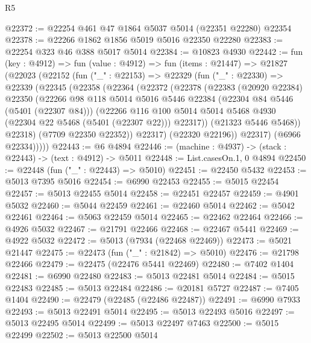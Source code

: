 \begin{lexlean}{R5}
\begin{coremodule}
@22372 := @22254 @461 @47 @1864 @5037 @5014 (@22351 @22280) @22354
@22378 := @22266 @1862 @1856 @5019 @5016 @22350 @22280
@22383 := @22254 @323 @46 @388 @5017 @5014
@22384 := @10823 @4930
@22442 := fun (key : @4912) =>
  fun (value : @4912) =>
  fun (items : @21447) =>
  @21827
    (@22023
      (@22152
        (fun ("_" : @22153) =>
        @22329
          (fun ("_" : @22330) =>
          @22339
            (@22345
              (@22358
                (@22364
                  (@22372
                    (@22378
                      (@22383
                        (@20920 @22384)
                        @22350
                        (@22266
                          @98
                          @118
                          @5014
                          @5016
                          @5446
                          @22384
                          (@22304 @84 @5446 (@5401 (@22307 @84)))
                          (@22266
                            @116
                            @100
                            @5014
                            @5014
                            @5468
                            @4930
                            (@22304 @22 @5468 (@5401 (@22307 @22)))
                            @22317))
                        (@21323 @5446 @5468))
                      @22318)
                    (@7709 @22350 @22352))
                  @22317)
                (@22320 @22196))
              @22317)
            (@6966 @22334)))))
@22443 := @6 @4894
@22446 := (machine : @4937) -> (stack : @22443) -> (text : @4912) -> @5011
@22448 := List.casesOn.{1, 0} @4894
@22450 := @22448 (fun ("_" : @22443) => @5010)
@22451 := @22450 @5432
@22453 := @5013 @7395 @5016
@22454 := @6990 @22453
@22455 := @5015 @22454
@22457 := @5013 @22455 @5014
@22458 := @22451 @22457
@22459 := @4901 @5032
@22460 := @5044 @22459
@22461 := @22460 @5014
@22462 := @5042 @22461
@22464 := @5063 @22459 @5014
@22465 := @22462 @22464
@22466 := @4926 @5032
@22467 := @21791 @22466
@22468 := @22467 @5441
@22469 := @4922 @5032
@22472 := @5013 (@7934 (@22468 @22469))
@22473 := @5021 @21447
@22475 := @22473 (fun ("_" : @21842) => @5010)
@22476 := @21798 @22466
@22479 := @22475 (@22476 @5441 @22469)
@22480 := @7402 @1404
@22481 := @6990 @22480
@22483 := @5013 @22481 @5014
@22484 := @5015 @22483
@22485 := @5013 @22484
@22486 := @20181 @5727
@22487 := @7405 @1404
@22490 := @22479 (@22485 (@22486 @22487))
@22491 := @6990 @7933
@22493 := @5013 @22491 @5014
@22495 := @5013 @22493 @5016
@22497 := @5013 @22495 @5014
@22499 := @5013 @22497 @7463
@22500 := @5015 @22499
@22502 := @5013 @22500 @5014

\end{coremodule}
\end{lexlean}
